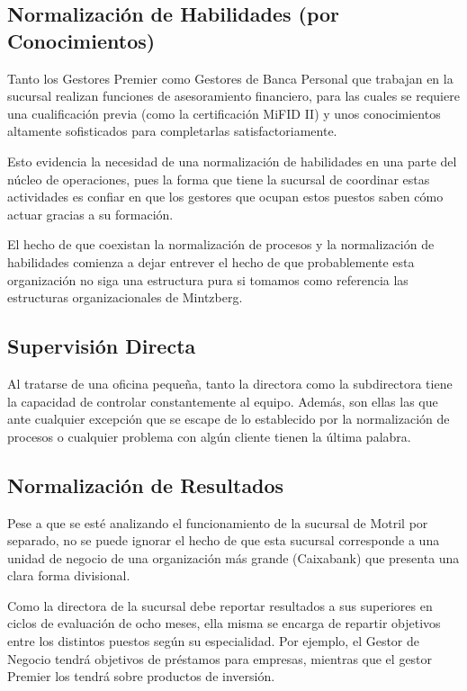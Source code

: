 \subsection{Normalización de Habilidades (por Conocimientos)}

Tanto los Gestores Premier como Gestores de Banca Personal que trabajan en la sucursal realizan funciones de asesoramiento financiero, para las cuales se requiere una cualificación previa (como la certificación MiFID II) y unos conocimientos altamente sofisticados para completarlas satisfactoriamente.

Esto evidencia la necesidad de una normalización de habilidades en una parte del núcleo de operaciones, pues la forma que tiene la sucursal de coordinar estas actividades es confiar en que los gestores que ocupan estos puestos saben cómo actuar gracias a su formación.

El hecho de que coexistan la normalización de procesos y la normalización de habilidades comienza a dejar entrever el hecho de que probablemente esta organización no siga una estructura pura si tomamos como referencia las estructuras organizacionales de Mintzberg.

\subsection{Supervisión Directa}

Al tratarse de una oficina pequeña, tanto la directora como la subdirectora tiene la capacidad de controlar constantemente al equipo. Además, son ellas las que ante cualquier excepción que se escape de lo establecido por la normalización de procesos o cualquier problema con algún cliente tienen la última palabra.

\subsection{Normalización de Resultados}

Pese a que se esté analizando el funcionamiento de la sucursal de Motril por separado, no se puede ignorar el hecho de que esta sucursal corresponde a una unidad de negocio de una organización más grande (Caixabank) que presenta una clara forma divisional. 

Como la directora de la sucursal debe reportar resultados a sus superiores en ciclos de evaluación de ocho meses, ella misma se encarga de repartir objetivos entre los distintos puestos según su especialidad. Por ejemplo, el Gestor de Negocio tendrá objetivos de préstamos para empresas, mientras que el gestor Premier los tendrá sobre productos de inversión.

